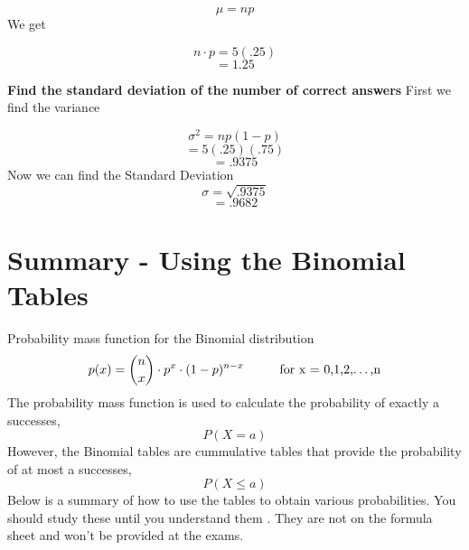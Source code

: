 \documentclass{report}
\begin{document}
$$ \mu = np$$
We get

   $$n \cdot p = 5(.25) $$
   $$= 1.25$$

  \bigbreak \noindent
  \textbf{Find the standard deviation of the number of correct answers}
  \bigbreak \noindent
  First we find the variance

$$  \sigma^2 = np(1-p)$$
$$= 5(.25)(.75)$$
$$ = .9375$$
Now we can find the Standard Deviation
$$ \sigma = \sqrt{.9375}$$
$$ = .9682$$
\pagebreak
\section*{Summary - Using the Binomial Tables}
\bigbreak \noindent
Probability mass function for the Binomial distribution
$$ p(x) = {n \choose x} \cdot p^{x} \cdot (1-p)^{n-x} \hspace{10mm} \text{for x = 0,1,2,\ldots,n}$$
\bigbreak \noindent
The probability mass function is used to calculate the probability of exactly a successes, 
$$ P(X = a)$$
\bigbreak \noindent
However, the Binomial tables are cummulative tables that provide the probability of at most a successes,
$$ P(X \le a)$$
\bigbreak \noindent
Below is a summary of how to use the tables to obtain various probabilities. You should study these until you understand them . They are not on the formula sheet and won't be provided at the exams.
\bigbreak \noindent
\end{document}
